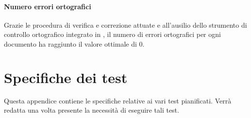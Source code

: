 \paragraph{Numero errori ortografici} \Spazio
Grazie le procedura di verifica e correzione attuate e all'ausilio dello strumento di controllo ortografico integrato in , il numero di errori ortografici per ogni documento ha raggiunto il valore ottimale di 0.

\section{Specifiche dei test}
Questa appendice contiene le specifiche relative ai vari test pianificati. Verrà redatta una volta presente la necessità di eseguire tali test.

